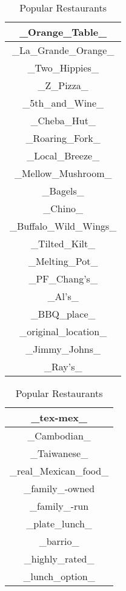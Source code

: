 \documentclass{article}
\begin{document}
\begin{table}[ht]
    \parbox{.22\linewidth}{
    \centering
    \begin{tabular}{|c|}
    \hline
    \_Orange\_Table\_\\
    \hline
    \_La\_Grande\_Orange\_\\
    \hline
    \_Two\_Hippies\_\\
    \hline
    \_Z\_Pizza\_\\
    \hline
    \_5th\_and\_Wine\_\\
    \hline
    \_Cheba\_Hut\_\\
    \hline
    \_Roaring\_Fork\_\\
    \hline
    \_Local\_Breeze\_\\
    \hline
    \_Mellow\_Mushroom\_\\
    \hline
    \_Bagels\_\\
    \hline
    \_Chino\_\\
    \hline
    \_Buffalo\_Wild\_Wings\_\\
    \hline
    \_Tilted\_Kilt\_\\
    \hline
    \_Melting\_Pot\_\\
    \hline
    \_PF\_Chang's\_\\
    \hline
    \_Al's\_\\
    \hline
    \_BBQ\_place\_\\
    \hline
    \_original\_location\_\\
    \hline
    \_Jimmy\_Johns\_\\
    \hline
    \_Ray's\_\\
    \hline
    \end{tabular}
    \caption{Popular Restaurants}
    }
    \hfill
    \parbox{.3\linewidth}{
    \centering
    \begin{tabular}{|c|}
    \hline
    \_tex-mex\_\\
    \hline
    \_Cambodian\_\\
    \hline
    \_Taiwanese\_\\
    \hline
    \_real\_Mexican\_food\_\\
    \hline
    \_family\_-owned\\
    \hline
    \_family\_-run\\
    \hline
    \_plate\_lunch\_\\
    \hline
    \_barrio\_\\
    \hline
    \_highly\_rated\_\\
    \hline
    \_lunch\_option\_\\
    \hline

\end{tabular}}
\end{table}
\end{document}
